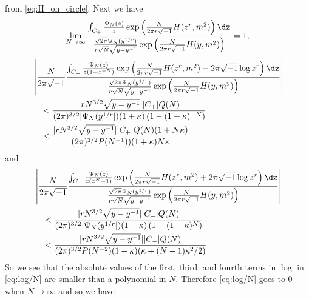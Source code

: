 \documentclass[a4paper]{amsart}
\theoremstyle{plain}
\theoremstyle{definition}
\theoremstyle{remark}
\numberwithin{equation}{section}
\begin{document}
from \eqref{eq:H_on_circle}.
Next we have
\begin{equation*}
  \lim_{N\to\infty}
  \frac{\int_{C_+}\frac{\Psi_N(z)}{z}
        \exp\left(\frac{N}{2\pi{r}\sqrt{-1}}H(z^r,m^2)\right)\dz}
         {\frac{\sqrt{2\pi}\Psi_N(y^{1/r})}{r\sqrt{N}\sqrt{y-y^{-1}}}
           \exp\left(
                 \frac{N}{2\pi{r}\sqrt{-1}}H(y,m^2)
               \right)}
  =1,
\end{equation*}
\begin{equation*}
\begin{split}
  &
  \left|
    \frac{N}{2\pi\sqrt{-1}}
    \frac{\int_{C_+}\frac{\Psi_N(z)}{z(1-z^{-N})}
          \exp
          \left(
            \frac{N}{2\pi{r}\sqrt{-1}}H(z^r,m^2)-2\pi\sqrt{-1}\log{z^r}
          \right)\dz}
         {\frac{\sqrt{2\pi}\Psi_N(y^{1/r})}{r\sqrt{N}\sqrt{y-y^{-1}}}
           \exp\left(
                 \frac{N}{2\pi{r}\sqrt{-1}}H(y,m^2)
               \right)}
  \right|
  \\
  &\quad
  <
  \frac{|rN^{3/2}\sqrt{y-y^{-1}}||C_{+}|Q(N)}
        {(2\pi)^{3/2}|\Psi_N(y^{1/r}|)
         (1+\kappa)\left(1-(1+\kappa)^{-N}\right)}
  \\
  &\quad
  <
  \frac{|rN^{3/2}\sqrt{y-y^{-1}}||C_{+}|Q(N)(1+N\kappa)}
        {(2\pi)^{3/2}P(N^{-1}))(1+\kappa)N\kappa}
\end{split}
\end{equation*}
and
\begin{equation*}
\begin{split}
  &
  \left|
    \frac{N}{2\pi\sqrt{-1}}
    \frac{\int_{C_-}\frac{\Psi_N(z)}{z(z^{N}-1)}
          \exp
          \left(
            \frac{N}{2\pi{r}\sqrt{-1}}H(z^r,m^2)+2\pi\sqrt{-1}\log{z^r}
          \right)\dz}
         {\frac{\sqrt{2\pi}\Psi_N(y^{1/r})}{r\sqrt{N}\sqrt{y-y^{-1}}}
           \exp\left(
                 \frac{N}{2\pi{r}\sqrt{-1}}H(y,m^2)
               \right)}
  \right|
  \\
  &\quad
  <
  \frac{|rN^{3/2}\sqrt{y-y^{-1}}||C_{-}|Q(N)}
       {(2\pi)^{3/2}|\Psi_N(y^{1/r}|)
         (1-\kappa)\left(1-(1-\kappa)^{N}\right)}
  \\
  &\quad
  <
  \frac{|rN^{3/2}\sqrt{y-y^{-1}}||C_{-}|Q(N)}
       {(2\pi)^{3/2}P(N^{-2})(1-\kappa)(\kappa+(N-1)\kappa^2/2)}.
\end{split}
\end{equation*}
So we see that the absolute values of the first, third, and fourth terms in
$\log$ in \eqref{eq:log/N} are smaller than a polynomial in $N$.
Therefore \eqref{eq:log/N} goes to $0$ when $N\to\infty$ and so we have
\end{document}
